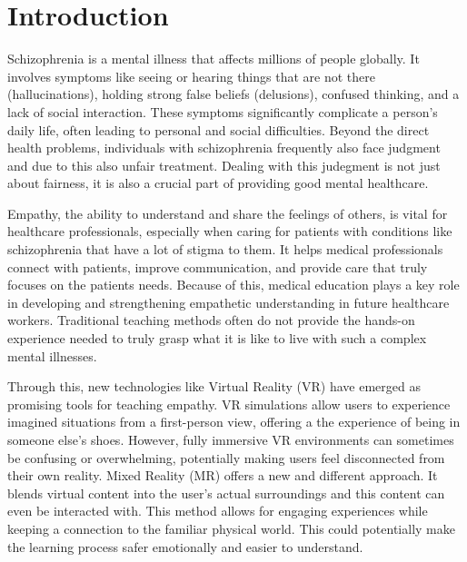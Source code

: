 \chapter{Introduction}
\label{ch:introduction}


Schizophrenia is a mental illness that affects millions of people globally. It involves symptoms like seeing or hearing things that are not there (hallucinations), holding strong false beliefs (delusions), confused thinking, and a lack of social interaction. These symptoms significantly complicate a person's daily life, often leading to personal and social difficulties. Beyond the direct health problems, individuals with schizophrenia frequently also face judgment and due to this also unfair treatment. Dealing with this judegment is not just about fairness, it is also a crucial part of providing good mental healthcare.

\vspace{1em}

Empathy, the ability to understand and share the feelings of others, is vital for healthcare professionals, especially when caring for patients with conditions like schizophrenia that have a lot of stigma to them. It helps medical professionals connect with patients, improve communication, and provide care that truly focuses on the patients needs. Because of this, medical education plays a key role in developing and strengthening empathetic understanding in future healthcare workers. Traditional teaching methods often do not provide the hands-on experience needed to truly grasp what it is like to live with such a complex mental illnesses.

\vspace{1em}

Through this, new technologies like Virtual Reality (VR) have emerged as promising tools for teaching empathy. VR simulations allow users to experience imagined situations from a first-person view, offering a the experience of being in someone else's shoes. However, fully immersive VR environments can sometimes be confusing or overwhelming, potentially making users feel disconnected from their own reality. Mixed Reality (MR) offers a new and different approach. It blends virtual content into the user's actual surroundings and this content can even be interacted with. This method allows for engaging experiences while keeping a connection to the familiar physical world. This could potentially make the learning process safer emotionally and easier to understand.

